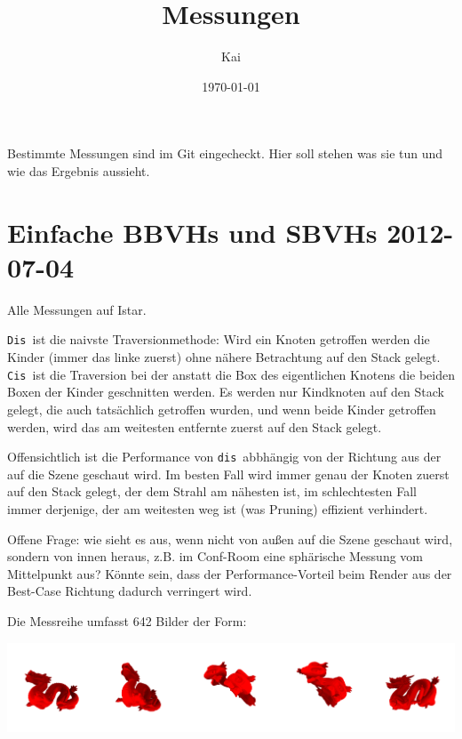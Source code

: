 \documentclass[a4paper,11pt]{article}
\title{Messungen}
\author{Kai}
\date{\today}
\begin{document}
\maketitle\thispagestyle{empty}
Bestimmte Messungen sind im Git eingecheckt. Hier soll stehen was sie tun und wie das Ergebnis aussieht.

\section{Einfache BBVHs und SBVHs \hfill 2012-07-04}

Alle Messungen auf Istar.

\newcommand\Cis{\texttt{Cis}\ }
\newcommand\Dis{\texttt{Dis}\ }
\newcommand\cis{\texttt{cis}\ }
\newcommand\dis{\texttt{dis}\ }
\newcommand\newword[1]{\marginpar{#1}}
\newcommand\frage{\marginpar{\tt \Large ?}}
\newcommand\todo{\marginpar{\tt \Large Todo!}}
\newcommand\file[1]{{\tt #1}}
\newcommand\code[1]{{\tt #1}}

\newword\dis
\Dis ist die naivste Traversionmethode: 
	Wird ein Knoten getroffen werden die Kinder (immer das linke zuerst) ohne nähere Betrachtung auf den Stack gelegt.
\newword\cis
\Cis ist die Traversion bei der anstatt die Box des eigentlichen Knotens die beiden Boxen der Kinder geschnitten werden. 
	Es werden nur Kindknoten auf den Stack gelegt, die auch tatsächlich getroffen wurden, und wenn beide Kinder
	getroffen werden, wird das am weitesten entfernte zuerst auf den Stack gelegt.

Offensichtlich ist die Performance von \dis abbhängig von der Richtung aus der auf die Szene geschaut wird.
Im besten Fall wird immer genau der Knoten zuerst auf den Stack gelegt, der dem Strahl am nähesten ist, 
	im schlechtesten Fall immer derjenige, der am weitesten weg ist (was Pruning) effizient verhindert.

Offene Frage: \frage wie sieht es aus, wenn nicht von außen auf die Szene geschaut wird, sondern von innen heraus, z.B. im Conf-Room eine
	sphärische Messung vom Mittelpunkt aus?
Könnte sein, dass der Performance-Vorteil beim Render aus der Best-Case Richtung dadurch verringert wird.

Die Messreihe umfasst 642 Bilder der Form:
\begin{center}
\includegraphics[width=\textwidth]{messreihe-bsp.png}
\end{center}
\end{document}
